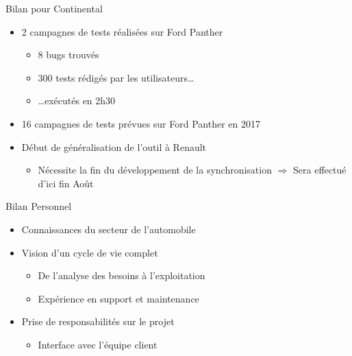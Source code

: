 \begin{frame}{Bilan pour Continental}
	\begin{itemize}
		\item 2 campagnes de tests réalisées sur Ford Panther
		\begin{itemize}
			\item 8 bugs trouvés
			\item 300 tests rédigés par les utilisateurs\ldots 
			\item \ldots exécutés en 2h30
		\end{itemize}
		\pause
		\vfill
		\item 16 campagnes de tests prévues sur Ford Panther en 2017
				\pause
		\vfill		
		\item Début de généralisation de l'outil à Renault
		\begin{itemize}
			\item Nécessite la fin du développement de la synchronisation\newline
			$\Rightarrow$ Sera effectué d'ici fin Août
		\end{itemize}
				\vfill
	\end{itemize}
\end{frame}
\begin{frame}{Bilan Personnel}
	\begin{itemize}
		\item Connaissances du secteur de l'automobile
		\vfill
						\pause
		\item Vision d'un cycle de vie complet
		\begin{itemize}
			\item De l'analyse des besoins à l'exploitation
			\item Expérience en support et maintenance
		\end{itemize}
						\pause
		\vfill		
		\item Prise de responsabilités sur le projet
		\begin{itemize}
			\item Interface avec l'équipe client
		\end{itemize}
	\end{itemize}
\end{frame}
